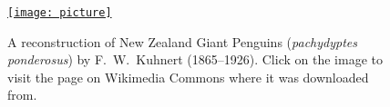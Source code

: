\documentclass{article}
\begin{document}
     
       \begin{figure}
         \href{http://commons.wikimedia.org/wiki/File:Pachydyptes_ponderosus.jpg}
              {\texttt{[image: picture]}}
         \caption{A reconstruction of New Zealand Giant Penguins (\emph{pachydyptes ponderosus}) by 
           F.~W.~Kuhnert (1865--1926). Click on the image to visit the page on Wikimedia Commons where it 
           was downloaded from.}
       \end{figure}
     
    
\end{document}

